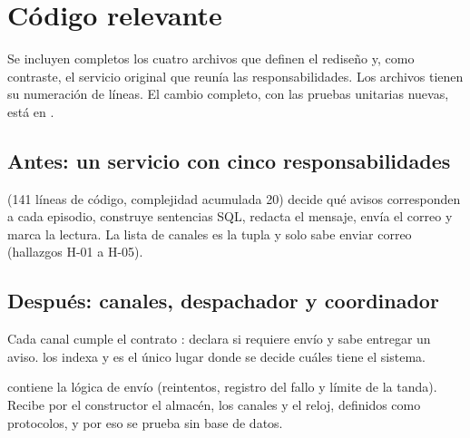 \documentclass[11pt,a4paper]{article}
\newcommand{\codigo}[2]{}
\begin{document}
\clearpage
\section{Código relevante}

Se incluyen completos los cuatro archivos que definen el rediseño y, como contraste, el servicio original que reunía las responsabilidades. Los archivos tienen su numeración de líneas. El cambio completo, con las pruebas unitarias nuevas, está en .

\subsection{Antes: un servicio con cinco responsabilidades}

 (141 líneas de código, complejidad acumulada 20) decide qué avisos corresponden a cada episodio, construye sentencias SQL, redacta el mensaje, envía el correo y marca la lectura. La lista de canales es la tupla  y  solo sabe enviar correo (hallazgos H-01 a H-05).

\codigo{antes_notification_service.py}{\ev{E-05}. Diseño actual: \cod{services/notification\_service.py} en el commit \cod{d5c054f}.}

\clearpage
\subsection{Después: canales, despachador y coordinador}

 Cada canal cumple el contrato : declara si requiere envío y sabe entregar un aviso.  los indexa y  es el único lugar donde se decide cuáles tiene el sistema.

\codigo{despues_channels.py}{\ev{E-07}. Diseño propuesto: \cod{services/channels.py} (contrato, canales y registro).}

\clearpage
{}  contiene la lógica de envío (reintentos, registro del fallo y límite de la tanda). Recibe por el constructor el almacén, los canales y el reloj, definidos como protocolos, y por eso se prueba sin base de datos.

\codigo{despues_notification_dispatcher.py}{\ev{E-07}. Diseño propuesto: \cod{services/notification\_dispatcher.py}.}
\end{document}
